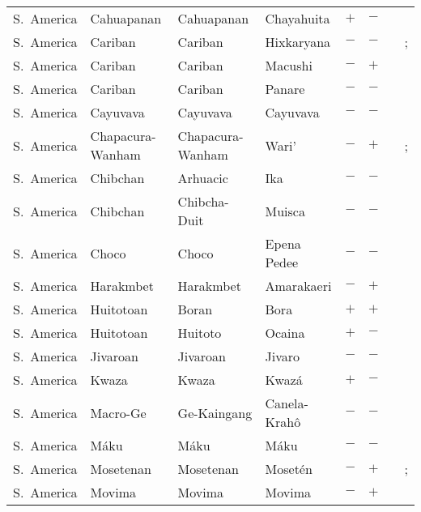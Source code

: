 \begin{landscape}
\begin{longtable}{l>{\raggedright\arraybackslash}p{2.2cm}>{\raggedright}p{2.5cm}>{\raggedright\arraybackslash}p{2.5cm}cc>{\raggedright\arraybackslash}p{3.4cm}>{\raggedright\arraybackslash}p{3.4cm}}
S.~America & Cahuapanan & Cahuapanan & Chayahuita & $+$ & $-$ & \citealt{Gil2013} & \citealt[258--272]{Hart1988}\\
S.~America & Cariban & Cariban & Hixkaryana & $-$ & $-$ & \citealt{Gil2013} & \citealt{Corbett2013}; \citealt[6--7]{Derbyshire1985}\\
S.~America & Cariban & Cariban & Macushi & $-$ & $+$ & \citealt[89]{Abbott1991} & \citealt[105]{Abbott1991}\\
S.~America & Cariban & Cariban & Panare & $-$ & $-$ & \citealt{Gil2013} & \citealt[263--264]{Derbyshire1990}\\
S.~America & Cayuvava & Cayuvava & Cayuvava & $-$ & $-$ & \citealt{Gil2013} & \citealt{Corbett2013}\\
S.~America & Chapacura-Wanham & Chapacura-Wanham & Wari' & $-$ & $+$ & \citealt{Gil2013} & \citealt{Corbett2013}; \citealt[2--3]{Everett1997}\\
S.~America & Chibchan & Arhuacic & Ika & $-$ & $-$ & \citealt{Gil2013} & \citealt{Corbett2013}\\
S.~America & Chibchan & Chibcha-Duit & Muisca & $-$ & $-$ & \citealt{Gil2013} & \citealt[81--108]{Adelaar2004}\\
S.~America & Choco & Choco & Epena Pedee & $-$ & $-$ & \citealt{Gil2013} & \citealt{Corbett2013}\\
S.~America & Harakmbet & Harakmbet & Amarakaeri & $-$ & $+$ & \citealt{Gil2013} & \citealt[213]{Tripp1995}\\
S.~America & Huitotoan & Boran & Bora & $+$ & $+$ & \citealt{Gil2013} & \citealt[27, 33, 36--37, 46--47]{Thiesen1996}\\
S.~America & Huitotoan & Huitoto & Ocaina & $+$ & $-$ & \citealt{Gil2013} & \citealt[257]{Derbyshire1990}\\
S.~America & Jivaroan & Jivaroan & Jivaro & $-$ & $-$ & \citealt{Gil2013} & \citealt[32]{Saad2014}\\
S.~America & Kwaza & Kwaza & Kwazá & $+$ & $-$ & \citealt{Gil2013} & \citealt[24, 105]{Voort2004}\\
S.~America & Macro-Ge & Ge-Kaingang & Canela-Krahô & $-$ & $-$ & \citealt{Gil2013} & \citealt{Corbett2013}\\
S.~America & Máku & Máku & Máku & $-$ & $-$ & \citealt{Gil2013} & \citealt[362]{Aikhenvald1999}\\
S.~America & Mosetenan & Mosetenan & Mosetén & $-$ & $+$ & \citealt{Gil2013} & \citealt{Corbett2013}; \citealt[288--302]{Sakel2002}\\
S.~America & Movima & Movima & Movima & $-$ & $+$ & \citealt[10, 113--114]{Haude2006} & \citealt[148--149]{Haude2006}\\

\end{longtable}
\end{landscape}
